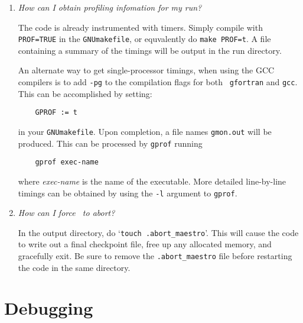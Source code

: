 \begin{enumerate}
\item {\em How can I obtain profiling infomation for my run?}

  The code is already instrumented with timers.  Simply compile with
  {\tt PROF=TRUE} in the {\tt GNUmakefile}, or equvalently do 
  {\tt make PROF=t}.  A file containing a summary of the timings will
  be output in the run directory.

  An alternate way to get single-processor timings, when using the GCC
  compilers is to add {\tt -pg} to the compilation flags for both {\tt
    gfortran} and {\tt gcc}.  This can be accomplished by setting:
  \begin{verbatim}
    GPROF := t
\end{verbatim}
  in your {\tt GNUmakefile}.  Upon completion, a file
  names {\tt gmon.out} will be produced.  This can be processed by
  {\tt gprof} running

  \begin{verbatim}
    gprof exec-name
\end{verbatim}
  where {\em exec-name} is the name of the executable.  More detailed
  line-by-line timings can be obtained by using the {\tt -l} argument
  to {\tt gprof}.

\item{\em How can I force \maestro\ to abort?}

  In the output directory, do `{\tt touch .abort\_maestro}'.  This 
  will cause the code to write out a final checkpoint file, free up
  any allocated memory, and gracefully exit.  Be sure to remove the 
  {\tt .abort\_maestro} file before restarting the code in the 
  same directory.



\end{enumerate}


\section{Debugging}

